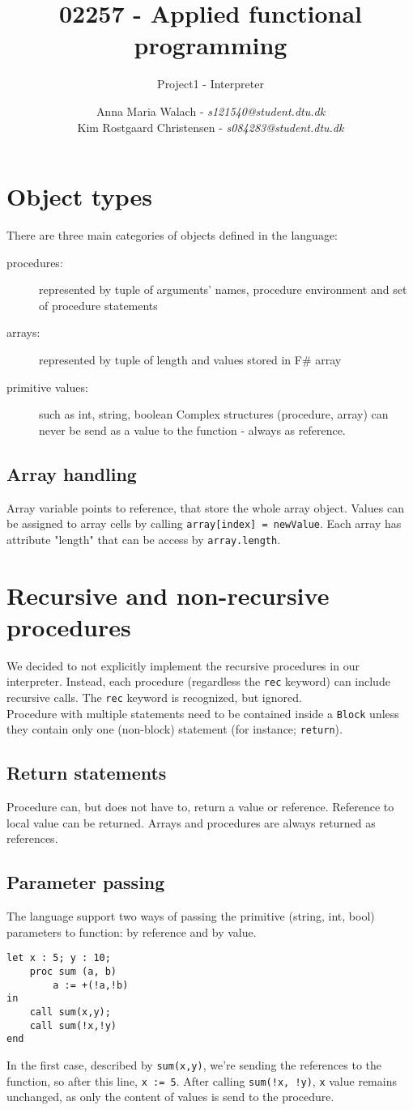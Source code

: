 \documentclass[10pt]{scrartcl}
\title{02257 - Applied functional programming}
\subtitle{Project1 - Interpreter}
\author{Anna Maria Walach - \textit {s121540@student.dtu.dk} \\ Kim Rostgaard Christensen - \textit {s084283@student.dtu.dk}}
\begin{document}
\maketitle
\section{Object types}
There are three main categories of objects defined in the language:
\begin{description}
\item [procedures:] represented by tuple of arguments' names, procedure environment and set of procedure statements
\item [arrays:] represented by tuple of length and values stored in F\# array
\item [primitive values:] such as int, string, boolean
Complex structures (procedure, array) can never be send as a value to the function - always as reference. 
\end{description}
\subsection{Array handling}
Array variable points to reference, that store the whole array object. Values can be assigned to array cells by calling \texttt{array[index] = newValue}. Each array has attribute "length" that can be access by \texttt{array.length}.
\section{Recursive and non-recursive procedures}
We decided to not explicitly implement the recursive procedures in our interpreter. Instead, each procedure (regardless the \texttt{rec} keyword) can include recursive calls. The \texttt{rec} keyword is recognized, but ignored. \\
Procedure with multiple statements need to be contained inside a \texttt{Block} unless they contain only one (non-block) statement (for instance; \texttt{return}).
\subsection{Return statements}
Procedure can, but does not have to, return a value or reference. Reference to local value can be returned. Arrays and procedures are always returned as references. 
\subsection{Parameter passing}
The language support two ways of passing the primitive (string, int, bool) parameters to function: by reference and by value. 
\begin{lstlisting}
let x : 5; y : 10;
	proc sum (a, b)
		a := +(!a,!b)
in
	call sum(x,y);
	call sum(!x,!y)
end
\end{lstlisting}
In the first case, described by \texttt{sum(x,y)}, we're sending the references to the function, so after this line, \texttt{x := 5}. After calling \texttt{sum(!x, !y)}, \texttt{x} value remains unchanged, as only the content of values is send to the procedure.
\end{document}
